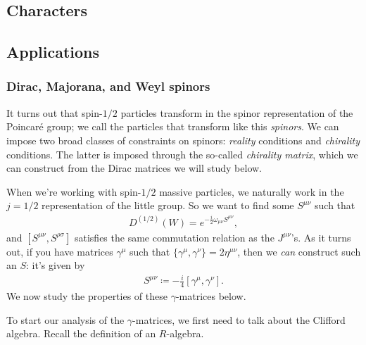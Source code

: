 \documentclass[11pt]{article}
\begin{document}
\subsection{Characters}


\subsection{Applications}

\subsubsection{Dirac, Majorana, and Weyl spinors}

\begin{reemark}
    It turns out that spin-$1/2$ particles transform in the spinor
    representation of the Poincaré group; we call the particles
    that transform like this \emph{spinors}. We can impose two
    broad classes of constraints on spinors: \emph{reality} conditions
    and \emph{chirality} conditions. The latter is imposed through the
    so-called \emph{chirality matrix}, which we can construct from
    the Dirac matrices we will study below.
\end{reemark}

\begin{eexample}
    When we're working with spin-$1/2$ massive particles, we naturally work
    in the $j = 1/2$ representation of the little group. So we want to find
    some $S^{\mu \nu}$ such that
    \begin{align*}
        D^{(1/2)}(W) = e^{- \frac{i}{2} \omega_{\mu \nu} S^{\mu \nu}},
    \end{align*} 
    and $[S^{\mu \nu}, S^{\rho \sigma}]$ satisfies the same commutation relation
    as the $J^{\mu \nu}$'s. As it turns out, if you have matrices $\gamma^\mu$
    such that $\{ \gamma^\mu, \gamma^\nu \} = 2 \eta^{\mu \nu}$, then we
    \emph{can} construct such an $S$: it's given by
    \begin{align*}
        \boxed{S^{\mu \nu} \coloneqq - \frac{i}{4} [\gamma^\mu, \gamma^\nu].}
    \end{align*}
    We now study the properties of these $\gamma$-matrices below.
\end{eexample}

To start our analysis of the $\gamma$-matrices, we first need to talk 
about the Clifford algebra. Recall the definition of an $R$-algebra.
\end{document}
